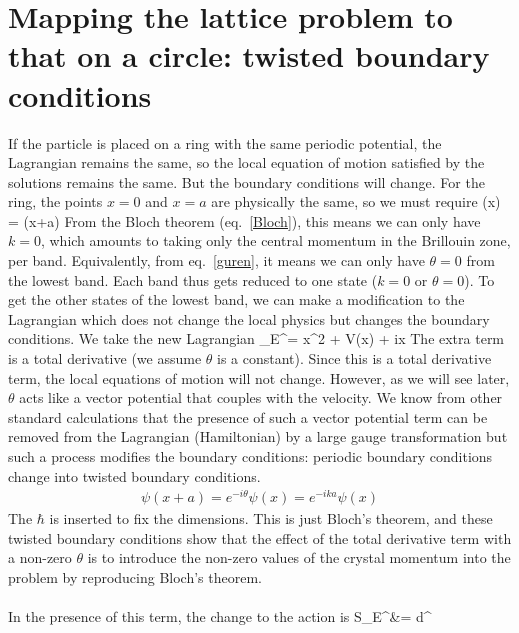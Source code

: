 \documentclass{article}
\begin{document}
\section{Mapping the lattice problem to that on a circle: twisted boundary conditions}
If the particle is placed on a ring with the same periodic potential, the Lagrangian remains the same, so the local equation of motion satisfied by the solutions remains the same. But the boundary conditions will change. For the ring, the points \(x = 0\) and \(x=a\) are physically the same, so we must require 
\beq
\psi(x) = \psi(x+a)
\eeq
From the Bloch theorem (eq.~\ref{Bloch}), this means we can only have \(k=0\), which amounts to taking only the central momentum in the Brillouin zone, per band. Equivalently, from eq.~\ref{guren}, it means we can only have \(\theta = 0\) from the lowest band. Each band thus gets reduced to one state (\(k=0\) or \(\theta = 0\)). To get the other states of the lowest band, we can make a modification to the Lagrangian which does not change the local physics but changes the boundary conditions. We take the new Lagrangian
\beq[newl]
_E^\prime= \dot x^2 + V(x) + i\dot x
\eeq
The extra term is a total derivative (we assume \(\theta\) is a constant). Since this is a total derivative term, the local equations of motion will not change. However, as we will see later, \(\theta\) acts like a vector potential that couples with the velocity. We know from other standard calculations that the presence of such a vector potential term can be removed from the Lagrangian (Hamiltonian) by a large gauge transformation but such a process modifies the boundary conditions: periodic boundary conditions change into twisted boundary conditions.
\begin{equation}\begin{aligned}
	\psi(x+a) = e^{-i\theta}\psi(x) = e^{-ika}\psi(x)
\end{aligned}\end{equation}
The \(\hbar\) is inserted to fix the dimensions. This is just Bloch's theorem, and these twisted boundary conditions show that the effect of the total derivative term with a non-zero \(\theta\) is to introduce the non-zero values of the crystal momentum into the problem by reproducing Bloch's theorem.\\\\
In the presence of this term, the change to the action is
\beq
S_E^\prime &= \int d\tau^\prime {} \\
\end{document}
